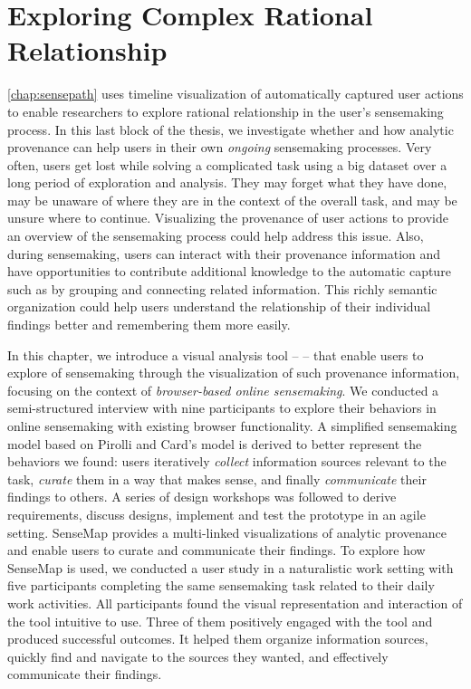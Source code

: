 \chapter{Exploring Complex Rational Relationship}
\label{chap:sensemap}

\graphicspath{{Chapter6/figures/}}

\autoref{chap:sensepath} uses timeline visualization of automatically captured user actions to enable researchers to explore rational relationship in the user's sensemaking process. In this last block of the thesis, we investigate whether and how analytic provenance can help users in their own \emph{ongoing} sensemaking processes. Very often, users get lost while solving a complicated task using a big dataset over a long period of exploration and analysis. They may forget what they have done, may be unaware of where they are in the context of the overall task, and may be unsure where to continue. Visualizing the provenance of user actions to provide an overview of the sensemaking process could help address this issue. Also, during sensemaking, users can interact with their provenance information and have opportunities to contribute additional knowledge to the automatic capture such as by grouping and connecting related information. This richly semantic organization could help users understand the relationship of their individual findings better and remembering them more easily.

In this chapter, we introduce a visual analysis tool -- \emph{} -- that enable users to explore  of sensemaking through the visualization of such  provenance information, focusing on the context of \emph{browser-based online sensemaking}. We conducted a semi-structured interview with nine participants to explore their behaviors in online sensemaking with existing browser functionality. A simplified sensemaking model based on Pirolli and Card's model is derived to better represent the behaviors we found: users iteratively \emph{collect} information sources relevant to the task, \emph{curate} them in a way that makes sense, and finally \emph{communicate} their findings to others. A series of design workshops was followed to derive requirements, discuss designs, implement and test the prototype in an agile setting. SenseMap provides a multi-linked visualizations of analytic provenance and enable users to curate and communicate their findings. To explore how SenseMap is used, we conducted a user study in a naturalistic work setting with five participants completing the same sensemaking task related to their daily work activities. All participants found the visual representation and interaction of the tool intuitive to use. Three of them positively engaged with the tool and produced successful outcomes. It helped them organize information sources, quickly find and navigate to the sources they wanted, and effectively communicate their findings. 





